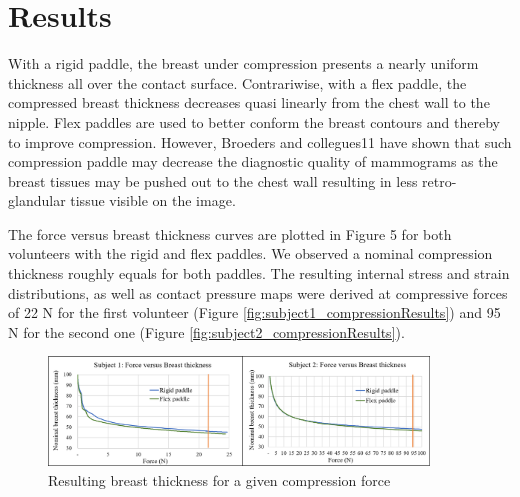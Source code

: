 \section{Results}\label{section:breastcompressionevaluation}
With a rigid paddle, the breast under compression presents a nearly uniform thickness all over the contact surface. Contrariwise, with a flex paddle, the compressed breast thickness decreases quasi linearly from the chest wall to the nipple. Flex paddles are used to better conform the breast contours and thereby to improve compression. However, Broeders and collegues11 have shown that such compression paddle may decrease the diagnostic quality of mammograms as the breast tissues may be pushed out to the chest wall resulting in less retro-glandular tissue visible on the image. 

The force versus breast thickness curves are plotted in Figure 5 for both volunteers with the rigid and flex paddles. We observed a nominal compression thickness roughly equals for both paddles. The resulting internal stress and strain distributions, as well as contact pressure maps were derived at compressive forces of 22 N for the first volunteer (Figure \ref{fig:subject1_compressionResults}) and 95 N for the second one (Figure \ref{fig:subject2_compressionResults}).

\begin{figure}[!h]
\centering
\includegraphics[width=0.9\textwidth,keepaspectratio]{figures/forceThicknessResults.png} 
\caption{Resulting breast thickness for a given compression force}\label{fig:forceThicknessResults}
\end{figure}

